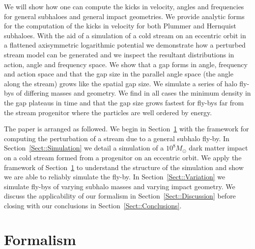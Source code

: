 \documentclass[useAMS,usenatbib,fleqn,a4paper]{mn2e}
\begin{document}
We will show how one can compute the kicks in velocity, angles and frequencies for general subhaloes and general impact geometries. We provide analytic forms for the computation of the kicks in velocity for both Plummer and Hernquist subhaloes. With the aid of a simulation of a cold stream on an eccentric orbit in a flattened axisymmetric logarithmic potential we demonstrate how a perturbed stream model can be generated and we inspect the resultant distributions in action, angle and frequency space. We show that a gap forms in angle, frequency and action space and that the gap size in the parallel angle space (the angle along the stream) grows like the spatial gap size. We simulate a series of halo fly-bys of differing masses and geometry. We find in all cases the minimum density in the gap plateaus in time and that the gap size grows fastest for fly-bys far from the stream progenitor where the particles are well ordered by energy.

The paper is arranged as followed. We begin in Section~\ref{Sect::Formalism} with the framework for computing the perturbation of a stream due to a general subhalo fly-by. In Section~\ref{Sect::Simulation} we detail a simulation of a $10^8M_\odot$ dark matter impact on a cold stream formed from a progenitor on an eccentric orbit. We apply the framework of Section~\ref{Sect::Formalism} to understand the structure of the simulation and show we are able to reliably simulate the fly-by. In Section~\ref{Sect::Variation} we simulate fly-bys of varying subhalo masses and varying impact geometry. We discuss the applicability of our formalism in Section~\ref{Sect::Discussion} before closing with our conclusions in Section~\ref{Sect::Conclusions}.

\section{Formalism}\label{Sect::Formalism}
\end{document}
